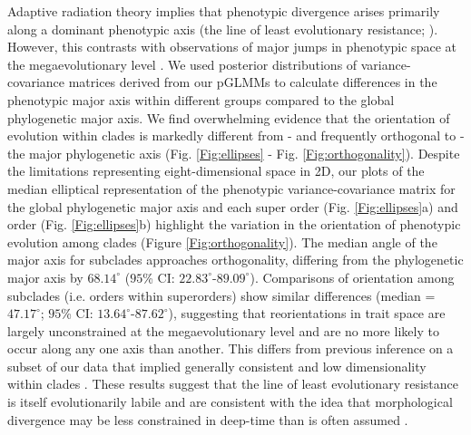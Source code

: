 \documentclass[12pt,letterpaper]{article}
\begin{document}
Adaptive radiation theory implies that phenotypic divergence arises primarily along a dominant phenotypic axis (the line of least evolutionary resistance; \cite{marroig2005size}).
However, this contrasts with observations of major jumps in phenotypic space at the megaevolutionary level \cite{puttick2014high,cooney2017mega,venditti2011multiple}.
We used posterior distributions of variance-covariance matrices derived from our pGLMMs to calculate differences in the phenotypic major axis within different groups compared to the global phylogenetic major axis.
We find overwhelming evidence that the orientation of evolution within clades is markedly different from - and frequently orthogonal to - the major phylogenetic axis (Fig. \ref{Fig:ellipses} - Fig. \ref{Fig:orthogonality}).
Despite the limitations representing eight-dimensional space in 2D, our plots of the median elliptical representation of the phenotypic variance-covariance matrix for the global phylogenetic major axis and each super order (Fig. \ref{Fig:ellipses}a) and order (Fig. \ref{Fig:ellipses}b) highlight the variation in the orientation of phenotypic evolution among clades (Figure \ref{Fig:orthogonality}).
The median angle of the major axis for subclades approaches orthogonality, differing from the phylogenetic major axis by $68.14^\circ$ ($95$\% CI: $22.83^\circ$-$89.09^\circ$).
Comparisons of orientation among subclades (i.e. orders within superorders) show similar differences (median = $47.17^\circ$; $95$\% CI: $13.64^\circ$-$87.62^\circ$), suggesting that reorientations in trait space are largely unconstrained at the megaevolutionary level and are no more likely to occur along any one axis than another.
This differs from previous inference on a subset of our data that implied generally consistent and low dimensionality within clades \cite{cooney2017mega}.
These results suggest that the line of least evolutionary resistance is itself evolutionarily labile and are consistent with the idea that morphological divergence may be less constrained in deep-time than is often assumed \cite{venditti2011multiple}.
\end{document}
